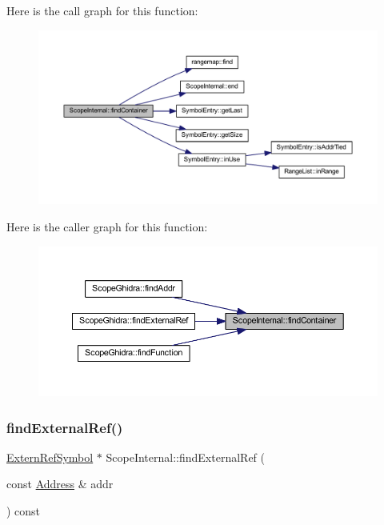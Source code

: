 Here is the call graph for this function\+:
\nopagebreak
\begin{figure}[H]
\begin{center}
\leavevmode
\includegraphics[width=350pt]{class_scope_internal_ae1eedf2f27fd8b0a7431568c4e4e2994_cgraph}
\end{center}
\end{figure}
Here is the caller graph for this function\+:
\nopagebreak
\begin{figure}[H]
\begin{center}
\leavevmode
\includegraphics[width=350pt]{class_scope_internal_ae1eedf2f27fd8b0a7431568c4e4e2994_icgraph}
\end{center}
\end{figure}
\mbox{\label{class_scope_internal_a7e440965cfb5642bcc751a622e5ec58d}} 
\subsubsection{\texorpdfstring{findExternalRef()}{findExternalRef()}}
{\footnotesize\ttfamily \mbox{\hyperlink{class_extern_ref_symbol}{Extern\+Ref\+Symbol}} $\ast$ Scope\+Internal\+::find\+External\+Ref (\begin{DoxyParamCaption}\item[{const \mbox{\hyperlink{class_address}{Address}} \&}]{addr }\end{DoxyParamCaption}) const\hspace{0.3cm}{\ttfamily [virtual]}}



